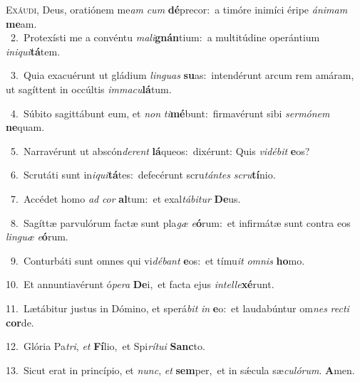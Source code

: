 \lettrine{\initial\textcolor{\initialcolor}{E}}{xáudi,} Deus, oratiónem me\textit{am} \textit{cum} \textbf{dé}\-precor:~\star a timóre inimíci éripe \textit{á}\-\textit{ni}\textit{mam} \textbf{me}\-am.\\
{\numbfont\textcolor{\numbcolor}{~2.}}~Protexísti me a convéntu \textit{ma}\-\textit{li}\textbf{gnán}tium:~\star a multitúdine operántium \textit{in}\-\textit{i}\textit{qui}\textbf{tá}tem.\par
{\numbfont\textcolor{\numbcolor}{~3.}}~Quia exacuérunt ut gládium \textit{lin}\-\textit{guas} \textbf{su}\-as:~\star intendérunt arcum rem amáram, ut sagíttent in occúltis \textit{im}\-\textit{ma}\textit{cu}\textbf{lá}tum.\par
{\numbfont\textcolor{\numbcolor}{~4.}}~Súbito sagittábunt eum, et \textit{non} \textit{ti}\-\textbf{mé}bunt:~\star firmavérunt sibi \textit{ser}\-\textit{mó}\textit{nem} \textbf{ne}\-quam.\par
{\numbfont\textcolor{\numbcolor}{~5.}}~Narravérunt ut abscón\-\textit{de}\-\textit{rent} \textbf{lá}\-queos:~\star dixérunt: Quis \textit{vi}\-\textit{dé}\textit{bit} \textbf{e}\-os?\par
{\numbfont\textcolor{\numbcolor}{~6.}}~Scrutáti sunt in\-\textit{i}\-\textit{qui}\textbf{tá}tes:~\star defecérunt scru\-\textit{tán}\-\textit{tes} \textit{scru}\-\textbf{tí}nio.\par
{\numbfont\textcolor{\numbcolor}{~7.}}~Accédet homo \textit{ad} \textit{cor} \textbf{al}\-tum:~\star et exal\-\textit{tá}\-\textit{bi}\textit{tur} \textbf{De}\-us.\par
{\numbfont\textcolor{\numbcolor}{~8.}}~Sagíttæ parvulórum factæ sunt pla\textit{gæ} \textit{e}\-\textbf{ó}rum:~\star et infirmátæ sunt contra eos \textit{lin}\-\textit{guæ} \textit{e}\-\textbf{ó}rum.\par
{\numbfont\textcolor{\numbcolor}{~9.}}~Conturbáti sunt omnes qui vi\-\textit{dé}\-\textit{bant} \textbf{e}\-os:~\star et tímu\textit{it} \textit{om}\-\textit{nis} \textbf{ho}\-mo.\par
{\numbfont\textcolor{\numbcolor}{10.}}~Et annuntiavérunt ó\-\textit{pe}\-\textit{ra} \textbf{De}\-i,~\star et facta ejus \textit{in}\-\textit{tel}\textit{le}\textbf{xé}runt.\par
{\numbfont\textcolor{\numbcolor}{11.}}~Lætábitur justus in Dómino, et sperá\textit{bit} \textit{in} \textbf{e}\-o:~\star et laudabúntur om\textit{nes} \textit{rec}\-\textit{ti} \textbf{cor}\-de.\par
{\numbfont\textcolor{\numbcolor}{12.}}~Glória Pa\-\textit{tri}\-, \textit{et} \textbf{Fí}\-lio,~\star et Spi\-\textit{rí}\-\textit{tu}\textit{i} \textbf{Sanc}\-to.\par
{\numbfont\textcolor{\numbcolor}{13.}}~Sicut erat in princípio, et \textit{nunc}\-, \textit{et} \textbf{sem}\-per,~\star et in sǽcula sæ\-\textit{cu}\-\textit{ló}\textit{rum}. \textbf{A}\-men.\par
